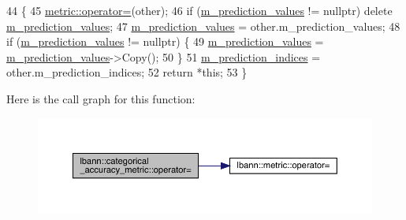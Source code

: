 \begin{DoxyCode}
44                                                                                                            
       \{
45   \hyperlink{classlbann_1_1metric_a4324342dab4892199a47df1d78b2cef5}{metric::operator=}(other);
46   \textcolor{keywordflow}{if} (\hyperlink{classlbann_1_1categorical__accuracy__metric_a796e50da721050d30e0cea709484154e}{m\_prediction\_values} != \textcolor{keyword}{nullptr}) \textcolor{keyword}{delete} 
      \hyperlink{classlbann_1_1categorical__accuracy__metric_a796e50da721050d30e0cea709484154e}{m\_prediction\_values};
47   \hyperlink{classlbann_1_1categorical__accuracy__metric_a796e50da721050d30e0cea709484154e}{m\_prediction\_values} = other.m\_prediction\_values;
48   \textcolor{keywordflow}{if} (\hyperlink{classlbann_1_1categorical__accuracy__metric_a796e50da721050d30e0cea709484154e}{m\_prediction\_values} != \textcolor{keyword}{nullptr}) \{
49     \hyperlink{classlbann_1_1categorical__accuracy__metric_a796e50da721050d30e0cea709484154e}{m\_prediction\_values} = \hyperlink{classlbann_1_1categorical__accuracy__metric_a796e50da721050d30e0cea709484154e}{m\_prediction\_values}->Copy();
50   \}
51   \hyperlink{classlbann_1_1categorical__accuracy__metric_a369a86a91f08f3ad3b12b870ccf2e427}{m\_prediction\_indices} = other.m\_prediction\_indices;
52   \textcolor{keywordflow}{return} *\textcolor{keyword}{this};
53 \}
\end{DoxyCode}
Here is the call graph for this function\+:\nopagebreak
\begin{figure}[H]
\begin{center}
\leavevmode
\includegraphics[width=350pt]{classlbann_1_1categorical__accuracy__metric_a859f8e13d7222c92e32b6751b194ef47_cgraph}
\end{center}
\end{figure}
\mbox{\label{classlbann_1_1categorical__accuracy__metric_a328a63ccc21c31efd511445f5b060960}} 
